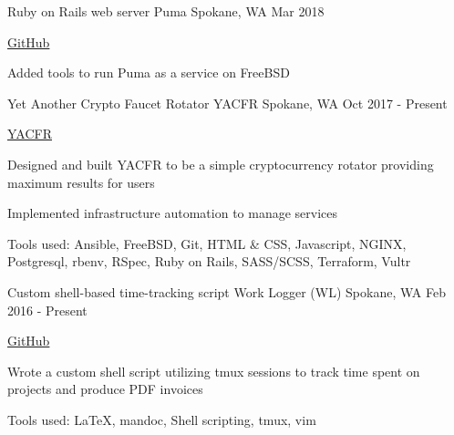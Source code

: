 

\begin{cventries}

  \cventry
    {Ruby on Rails web server} %
    {Puma} %
    {Spokane, WA} %
    {Mar 2018} %
    {
      \begin{cvitems} %
        \item {\href{https://github.com/puma/puma/tree/master/tools/jungle/rc.d}{GitHub}}
        \item {Added tools to run Puma as a service on FreeBSD}
      \end{cvitems}
    }

  \cventry
    {Yet Another Crypto Faucet Rotator} %
    {YACFR} %
    {Spokane, WA} %
    {Oct 2017 - Present} %
    {
      \begin{cvitems} %
        \item {\href{https://yacfr.com}{YACFR}}
        \item {Designed and built YACFR to be a simple cryptocurrency rotator providing maximum results for users}
        \item {Implemented infrastructure automation to manage services}
        \item {Tools used: Ansible, FreeBSD, Git, HTML \& CSS, Javascript, NGINX, Postgresql, rbenv, RSpec, Ruby on Rails, SASS/SCSS, Terraform, Vultr}
      \end{cvitems}
    }

  \cventry
    {Custom shell-based time-tracking script} %
    {Work Logger (WL)} %
    {Spokane, WA} %
    {Feb 2016 - Present} %
    {
      \begin{cvitems} %
        \item {\href{https://github.com/desnudopenguino/wl}{GitHub}}
        \item {Wrote a custom shell script utilizing tmux sessions to track time spent on projects and produce PDF invoices}
        \item {Tools used: LaTeX, mandoc, Shell scripting, tmux, vim}
      \end{cvitems}
    }


\end{cventries}
